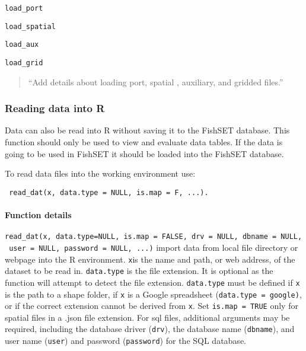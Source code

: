 \documentclass[
]{article}
\begin{document}
\texttt{load\_port}

\texttt{load\_spatial}

\texttt{load\_aux}

\texttt{load\_grid}

\begin{quote}
``Add details about loading port, spatial , auxiliary, and gridded files.''
\end{quote}

\hypertarget{reading-data-into-r}{%
\subsubsection{Reading data into R}\label{reading-data-into-r}}

Data can also be read into R without saving it to the FishSET database. This function should only be used to view and evaluate data tables. If the data is going to be used in FishSET it should be loaded into the FishSET database.

To read data files into the working environment use:

\begin{verbatim}
 read_dat(x, data.type = NULL, is.map = F, ...). 
\end{verbatim}

\hypertarget{function-details-1}{%
\paragraph{Function details}\label{function-details-1}}

\texttt{read\_dat(x,\ data.type=NULL,\ is.map\ =\ FALSE,\ drv\ =\ NULL,\ dbname\ =\ NULL,\ user\ =\ NULL,\ password\ =\ NULL,\ ...)} import data from local file directory or webpage into the R environment. \texttt{x}is the name and path, or web address, of the dataset to be read in. \texttt{data.type} is the file extension. It is optional as the function will attempt to detect the file extension. \texttt{data.type} must be defined if \texttt{x} is the path to a shape folder, if \texttt{x} is a Google spreadsheet (\texttt{data.type\ =\ \textquotesingle{}google\textquotesingle{})}, or if the correct extension cannot be derived from \texttt{x}. Set \texttt{is.map\ =\ TRUE} only for spatial files in a .json file extension. For sql files, additional arguments may be required, including the database driver (\texttt{drv}), the database name (\texttt{dbname}), and user name (\texttt{user}) and password (\texttt{password}) for the SQL database.
\end{document}
